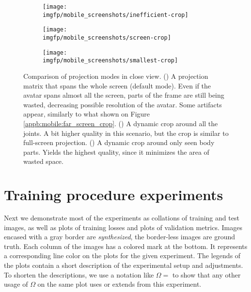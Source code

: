 \begin{figure}
	\centering
	\begin{subfigure}[b]{0.32\textwidth}
		\centering
		\texttt{[image: \\imgfp/mobile\_screenshots/inefficient-crop]}%
		\caption{}
		\label{appb:mobile:zoom_inefficient_crop}
	\end{subfigure}
	\hfill
	\begin{subfigure}[b]{0.32\textwidth}
		\centering
		\texttt{[image: \\imgfp/mobile\_screenshots/screen-crop]}
		\caption{}
		\label{appb:mobile:zoom_screen_crop}
	\end{subfigure}
	\hfill
	\begin{subfigure}[b]{0.32\textwidth}
		\centering
		\texttt{[image: \\imgfp/mobile\_screenshots/smallest-crop]}
		\caption{}
		\label{appb:mobile:zoom_smallest_crop}
	\end{subfigure}
	\caption{Comparison of projection modes in close view. (\protect{}) A projection matrix that spans the whole screen (default mode). Even if the avatar spans almost all the screen, parts of the frame are still being wasted, decreasing possible resolution of the avatar. Some artifacts appear, similarly to what shown on Figure \ref{appb:mobile:far_screen_crop}. (\protect{}) A dynamic crop around all the joints. A bit higher quality in this scenario, but the crop is similar to full-screen projection. (\protect{}) A dynamic crop around only seen body parts. Yields the highest quality, since it minimizes the area of wasted space.}
\end{figure}
\clearpage
\newpage

\section{Training procedure experiments}
\label{appb:exps}
Next we demonstrate most of the experiments as collations of training and test images, as well as plots of training losses and plots of validation metrics. Images encased with a gray border are \textit{synthesized}, the border-less images are ground truth. Each column of the images has a colored mark at the bottom. It represents a corresponding line color on the plots for the given experiment. The legends of the plots contain a short description of the experimental setup and adjustments. To shorten the descriptions, we use a notation like $\Omega=$ to show that any other usage of $\Omega$ on the same plot uses or extends from this experiment. 

